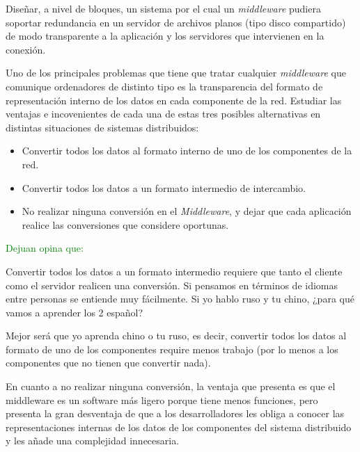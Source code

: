
  \begin{problem}[1]
  Diseñar, a nivel de bloques, un sistema por el cual un \textit{middleware} pudiera soportar redundancia en un servidor de archivos planos (tipo disco
  compartido) de modo transparente a la aplicación y los servidores
  que intervienen en la conexión.


  \solution



  \end{problem}

  \begin{problem}[2]
  Uno de los principales problemas que tiene que tratar cualquier
\textit{middleware} que comunique ordenadores de distinto tipo es la transparencia del formato
  de representación interno de los datos en cada componente de la
  red. Estudiar las ventajas e incovenientes de cada una de estas tres posibles
  alternativas en distintas situaciones de sistemas distribuidos:
    \begin{itemize}
    \item Convertir todos los datos al formato interno de uno de los componentes
    de la red.
    \item Convertir todos los datos a un formato intermedio de intercambio.
    \item No realizar ninguna conversión en el \textit{Middleware}, y dejar que cada
aplicación realice las conversiones que considere oportunas.
\end{itemize}
    \solution
\textcolor{green}{Dejuan opina que:}

Convertir todos los datos a un formato intermedio requiere que tanto el cliente como el servidor realicen una conversión. Si pensamos en términos de idiomas entre personas se entiende muy fácilmente. Si yo hablo ruso y tu chino, ¿para qué vamos a aprender los 2 español?

Mejor será que yo aprenda chino o tu ruso, es decir, convertir todos los datos al formato de uno de los componentes require menos trabajo (por lo menos a los componentes que no tienen que convertir nada).

En cuanto a no realizar ninguna conversión, la ventaja que presenta es que el middleware es un software más ligero porque tiene menos funciones, pero presenta la gran desventaja de que a los desarrolladores les obliga a conocer las representaciones internas de los datos de los componentes del sistema distribuido y les añade una complejidad innecesaria.

    \end{problem}

